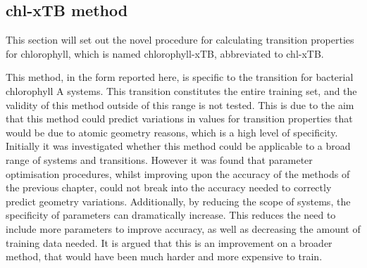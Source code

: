 \subsection{chl-xTB method}
\label{subsec:chl_method}
This section will set out the novel procedure for calculating transition properties
for chlorophyll, which is named chlorophyll-xTB, abbreviated to chl-xTB.

This method, in the form reported here, is specific to the \Qy transition for 
bacterial chlorophyll A systems. This transition constitutes the entire training
set, and the validity of this method outside of this range is not tested. This is
due to the aim that this method could predict variations in values for transition
properties that would be due to atomic geometry reasons, which is a high level of
specificity.
Initially it was investigated whether this method could be applicable to a broad
range of systems and transitions. However it was found that parameter optimisation
procedures, whilst improving upon the accuracy of the \dxtb methods of the previous
chapter, could not break into the accuracy needed to correctly predict geometry variations.
Additionally, by reducing the scope of systems, the specificity of parameters can
dramatically increase. This reduces the need to include more parameters to improve
accuracy, as well as decreasing the amount of training data needed. It is
argued that this is an improvement on a broader method, that would have been much
harder and more expensive to train.

